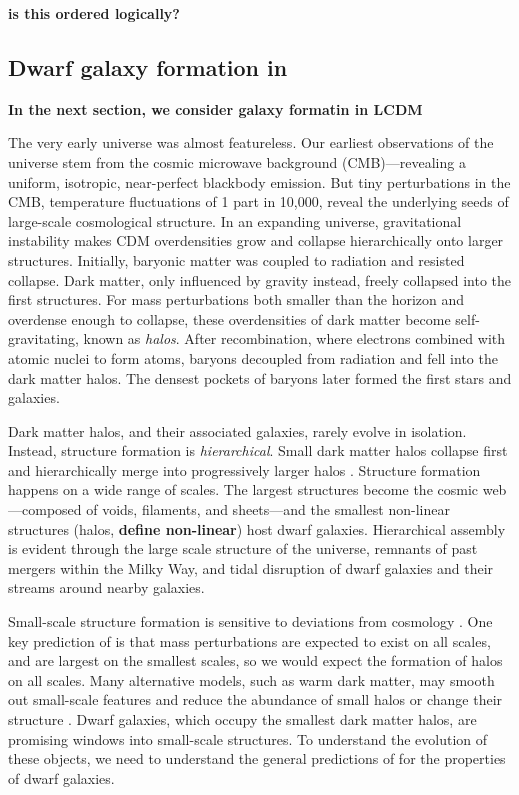 \textbf{is this ordered logically?}

\subsection{\texorpdfstring{Dwarf galaxy formation in
\LCDM}{Dwarf galaxy formation in }}\label{dwarf-galaxy-formation-in}

\textbf{In the next section, we consider galaxy formatin in LCDM}

The very early universe was almost featureless. Our earliest
observations of the universe stem from the cosmic microwave background
(CMB)---revealing a uniform, isotropic, near-perfect blackbody emission.
But tiny perturbations in the CMB, temperature fluctuations of 1 part in
10,000, reveal the underlying seeds of large-scale cosmological
structure. In an expanding universe, gravitational instability makes CDM
overdensities grow and collapse hierarchically onto larger structures.
Initially, baryonic matter was coupled to radiation and resisted
collapse. Dark matter, only influenced by gravity instead, freely
collapsed into the first structures. For mass perturbations both smaller
than the horizon and overdense enough to collapse, these overdensities
of dark matter become self-gravitating, known as \emph{halos}. After
recombination, where electrons combined with atomic nuclei to form
atoms, baryons decoupled from radiation and fell into the dark matter
halos. The densest pockets of baryons later formed the first stars and
galaxies.

Dark matter halos, and their associated galaxies, rarely evolve in
isolation. Instead, structure formation is \emph{hierarchical}. Small
dark matter halos collapse first and hierarchically merge into
progressively larger halos
\citep[e.g.,][]{blumenthal+1984, white+rees1978, white+frenk1991}.
Structure formation happens on a wide range of scales. The largest
structures become the cosmic web---composed of voids, filaments, and
sheets---and the smallest non-linear structures (halos, \textbf{define
non-linear}) host dwarf galaxies. Hierarchical assembly is evident
through the large scale structure of the universe, remnants of past
mergers within the Milky Way, and tidal disruption of dwarf galaxies and
their streams around nearby galaxies.

Small-scale structure formation is sensitive to deviations from
\LCDM cosmology \citep[e.g.,][]{bechtol+2022}. One key prediction of
\LCDM is that mass perturbations are expected to exist on all scales,
and are largest on the smallest scales, so we would expect the formation
of halos on all scales. Many alternative models, such as warm dark
matter, may smooth out small-scale features and reduce the abundance of
small halos or change their structure \citep[e.g.,][]{lovell+2014}.
Dwarf galaxies, which occupy the smallest dark matter halos, are
promising windows into small-scale structures. To understand the
evolution of these objects, we need to understand the general
predictions of \LCDM for the properties of dwarf galaxies.

